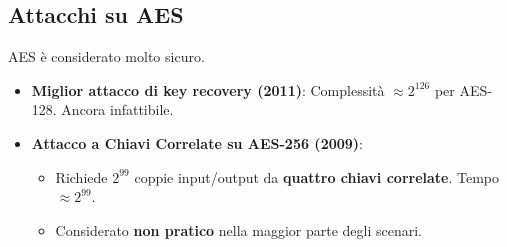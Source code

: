 \subsection{Attacchi su AES}
AES è considerato molto sicuro.
\begin{itemize}
    \item \textbf{Miglior attacco di key recovery (2011)}: Complessità $\approx 2^{126}$ per AES-128. Ancora infattibile.
    \item \textbf{Attacco a Chiavi Correlate su AES-256 (2009)}:
    \begin{itemize}
        \item Richiede $2^{99}$ coppie input/output da \textbf{quattro chiavi correlate}. Tempo $\approx 2^{99}$.
        \item Considerato \textbf{non pratico} nella maggior parte degli scenari.
    \end{itemize}
\end{itemize}

